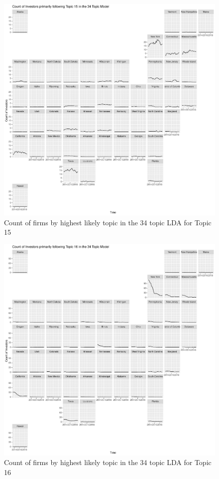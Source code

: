 		\begin{figure}
		\centering
		\includegraphics[width=1\linewidth]{Figures/ChapterV/USA_34_Topic15.pdf}
		\caption[Count of firm for Topic 15 by quarter]{Count of firms by highest likely topic in the 34 topic LDA for Topic 15}
		\label{fig:StateLDA15}
	\end{figure}
	
		\begin{figure}
		\centering
		\includegraphics[width=1\linewidth]{Figures/ChapterV/USA_34_Topic16.pdf}
		\caption[Count of firm for Topic 16 by quarter]{Count of firms by highest likely topic in the 34 topic LDA for Topic 16}
		\label{fig:StateLDA16}
	\end{figure}
	
